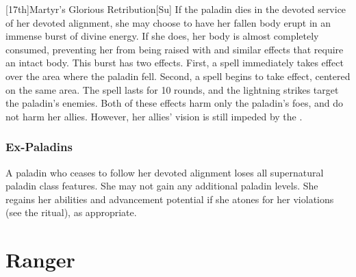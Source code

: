 [17th]{Martyr's Glorious Retribution}[Su]
If the paladin dies in the devoted service of her devoted alignment, she may choose to have her fallen body erupt in an immense burst of divine energy.
If she does, her body is almost completely consumed, preventing her from being raised with  and similar effects that require an intact body.
This burst has two effects.
First, a  spell immediately takes effect over the area where the paladin fell.
Second, a  spell begins to take effect, centered on the same area.
The spell lasts for 10 rounds, and the lightning strikes target the paladin's enemies.
Both of these effects harm only the paladin's foes, and do not harm her allies.
However, her allies' vision is still impeded by the .

\subsubsection{Ex-Paladins}
A paladin who ceases to follow her devoted alignment loses all supernatural paladin class features.
She may not gain any additional paladin levels.
She regains her abilities and advancement potential if she atones for her violations (see the  ritual), as appropriate.

\section{Ranger}

